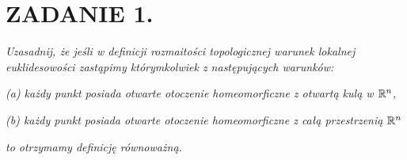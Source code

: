 \documentclass{article}
\begin{document}
\section*{ZADANIE 1.}
\emph{Uzasadnij, że jeśli w definicji rozmaitości topologicznej warunek lokalnej euklidesowości zastąpimy którymkolwiek z następujących warunków:}

\emph{(a) każdy punkt posiada otwarte otoczenie homeomorficzne z otwartą kulą w $\mathbb{R}^n$,}

\emph{(b) każdy punkt posiada otwarte otoczenie homeomorficzne z całą przestrzenią $\mathbb{R}^n$}

\emph{to otrzymamy definicję równoważną.}
\end{document}
